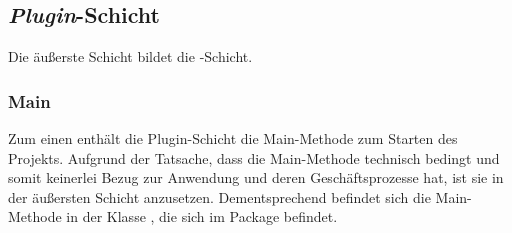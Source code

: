 \subsection*{\textit{Plugin}-Schicht}
Die äußerste Schicht bildet die \href{https://github.com/lucasmerkel/dhbw-advancedswe-programmentwurf/tree/main/swe_programmentwurf/consumergoods-inventory-planner/0-cip-plugins}{}-Schicht.

\subsubsection*{Main}
Zum einen enthält die Plugin-Schicht die Main-Methode zum Starten des Projekts.
Aufgrund der Tatsache, dass die Main-Methode technisch bedingt und somit keinerlei Bezug zur Anwendung und deren Geschäftsprozesse hat, ist sie in der äußersten Schicht anzusetzen.
Dementsprechend befindet sich die Main-Methode in der Klasse \href{https://github.com/lucasmerkel/dhbw-advancedswe-programmentwurf/blob/d5c89113d12c3b877ddc4d6a99225b277ddd468f/swe_programmentwurf/consumergoods-inventory-planner/0-cip-plugins/src/main/java/de/dhbw/cip/ConsumerInventoryPlannerApplication.java}{}, die sich im Package \href{https://github.com/lucasmerkel/dhbw-advancedswe-programmentwurf/tree/main/swe_programmentwurf/consumergoods-inventory-planner/0-cip-plugins/src/main/java/de/dhbw/cip}{} befindet.

